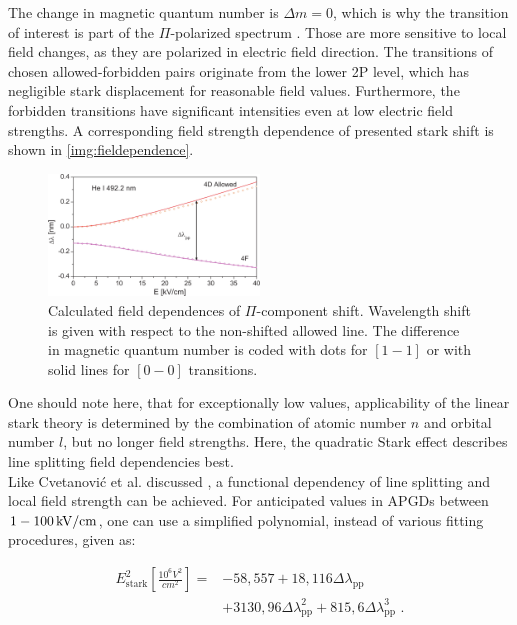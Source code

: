 \documentclass[a4paper,10pt,twoside]{article}
\newcommand{\tenpo}[1]{ 10^{#1}}
\newcommand{\ix}[1]{_\text{#1}}
\begin{document}
		The change in magnetic quantum number is $\Delta m=0$, which is why the transition of interest is part of the $\Pi$-polarized spectrum \cite{starkshiftmeas}. Those are more sensitive to local field changes, as they are polarized in electric field direction. The transitions of chosen allowed-forbidden pairs originate from the lower 2P level, which has negligible stark displacement for reasonable field values. Furthermore, the forbidden transitions have significant intensities even at low electric field strengths. A corresponding field strength dependence of presented stark shift is shown in \autoref{img:fieldependence}.
		
			\begin{figure}[b!]
				\centering
				\includegraphics[width=0.5\textwidth]{figures/stark/starkshiftfielddependence.pdf}
				\caption{Calculated field dependences of $\Pi$-component shift. Wavelength shift is given with respect to the non-shifted allowed line. The difference in magnetic quantum number is coded with dots for $[1-1]$ or with solid lines for $[0-0]$ transitions. \cite{starkshiftmeas}}
				\label{img:fieldependence}
			\end{figure}
		
		One should note here, that for exceptionally low values, applicability of the linear stark theory is determined by the combination of atomic number $n$ and orbital number $l$, but no longer field strengths. Here, the quadratic Stark effect describes line splitting field dependencies best.\\		
		Like Cvetanovi{\'c} et al. discussed \cite{starkshiftmeas}, a functional dependency of line splitting and local field strength can be achieved. For anticipated values in APGDs between $\unit[1-100]{kV/cm}$, one can use a simplified polynomial, instead of various fitting procedures, given as:
		
			\begin{align}
				E\ix{stark}^2\left[\frac{\tenpo{6}V^2}{cm^2}\right]=&-58,557+18,116\Delta\lambda\ix{pp} \nonumber \\
				&+3130,96\Delta\lambda\ix{pp}^2+815,6\Delta\lambda\ix{pp}^3 \,\,.
			\end{align}
		
\end{document}
